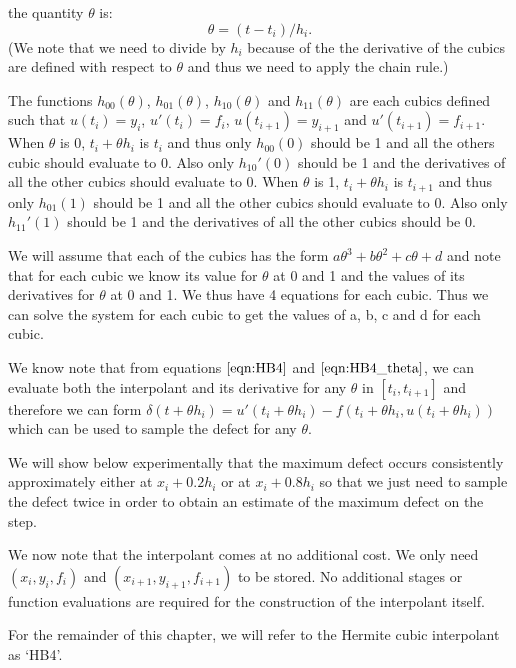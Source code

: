 \documentclass{article}
\begin{document}
the quantity $\theta$ is:
\begin{equation}
\label{eqn:HB4_theta}
\theta = (t - t_i) / h_i.
\end{equation}
(We note that we need to divide by $h_i$ because of the the derivative of the cubics are defined with respect to $\theta$ and thus we need to apply the chain rule.)

The functions $h_{00}(\theta)$, $h_{01}(\theta)$, $h_{10}(\theta)$ and $h_{11}(\theta)$ are each cubics defined such that $u(t_i)= y_i$, $u'(t_i) = f_i$, $u(t_{i+1}) = y_{i + 1}$ and $u'(t_{i + 1}) = f_{i + 1}$. When $\theta$ is 0, $t_i + \theta h_i$ is $t_i$ and thus only $h_{00}(0)$ should be 1 and all the others cubic should evaluate to 0. Also only $h_{10}'(0)$ should be 1 and the derivatives of all the other cubics should evaluate to 0. When $\theta$ is 1, $t_i + \theta h_i$ is $t_{i + 1}$ and thus only $h_{01}(1)$ should be 1 and all the other cubics should evaluate to 0. Also only $h_{11}'(1)$ should be 1 and the derivatives of all the other cubics should be 0.

We will assume that each of the cubics has the form $a\theta^3 + b\theta^2 + c\theta + d$ and note that for each cubic we know its value for $\theta$ at 0 and 1 and the values of its derivatives for $\theta$ at 0 and 1. We thus have 4 equations for each cubic. Thus we can solve the system for each cubic to get the values of a, b, c and d for each cubic.

We know note that from equations $\ref{eqn:HB4}$ and $\ref{eqn:HB4_theta}$, we can evaluate both the interpolant and its derivative for any $\theta$ in $[t_i, t_{i + 1}]$ and therefore we can form $\delta(t + \theta h_i) = u'(t_i + \theta h_i) - f(t_i + \theta h_i, u(t_i + \theta h_i))$ which can be used to sample the defect for any $\theta$.

We will show below experimentally that the maximum defect occurs consistently approximately either at $x_i + 0.2h_i$ or at $x_i + 0.8h_i$ so that we just need to sample the defect twice in order to obtain an estimate of the maximum defect on the step.

We now note that the interpolant comes at no additional cost. We only need $(x_i, y_i, f_i)$ and $(x_{i + 1}, y_{i + 1}, f_{i + 1})$ to be stored. No additional stages or function evaluations are required for the construction of the interpolant itself. 

For the remainder of this chapter, we will refer to the Hermite cubic interpolant as `HB4'.
\end{document}
